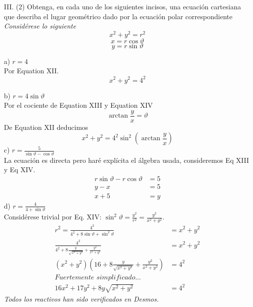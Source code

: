\documentclass{article}
\begin{document}
\newpage
III. (2) Obtenga, en cada uno de los siguientes incisos, una ecuación cartesiana que describa el lugar geométrico dado por la ecuación polar correspondiente\\
\textit{Considérese lo siguiente}
\begin{equation}
    x^2+y^2=r^2
\end{equation}
\begin{equation}
    x = r\cos\vartheta
\end{equation}
\begin{equation}
    y= r\sin\vartheta    
\end{equation}


\noindent a) $r=4$\\
Por Equation XII.
\begin{equation*}
    x^2+y^2=4^2
\end{equation*}


\noindent b) $r=4\sin \vartheta$\\
Por el cociente de Equation XIII y Equation XIV
\begin{equation*}
    \arctan \frac{y}{x} = \vartheta
\end{equation*}
De Equation XII deducimos
\begin{equation*}
    x^2+y^2=4^2\sin^2 \left(\arctan \frac{y}{x}\right)
\end{equation*}
c) $r = \frac{5}{\sin \vartheta - \cos \vartheta}$ \\
La ecuación es directa pero haré explícita el álgebra usada, consideremos Eq XIII y Eq XIV.
\begin{align*}
    r\sin \vartheta - r\cos \vartheta &= 5 \\
    y - x &= 5 \\
    x + 5 &= y
\end{align*}
d) $r = \frac{4}{4+\sin\vartheta}$ \\
Considérese trivial por Eq. XIV: $\sin^2\vartheta = \frac{y^2}{r^2} = \frac{y^2}{x^2 + y^2}$.
\begin{align*}
    r^2 = \frac{4^2}{4^2 + 8\sin\vartheta + \sin^2\vartheta} &= x^2 + y^2 \\
    \frac{4^2}{4^2 + 8\frac{y}{\sqrt{x^2+y^2}} + \frac{y^2}{x^2+y^2}} &= x^2 + y^2 \\
    (x^2 + y^2)(16 + 8\frac{y}{\sqrt{x^2+y^2}} + \frac{y^2}{x^2+y^2}) &= 4^2 \\
    \textit{Fuertemente simplificado...}& \\
    16x^2+17y^2+8y\sqrt{x^2+y^2} &= 4^2
\end{align*}
\textit{Todos los reactivos han sido verificados en Desmos.}
\end{document}
